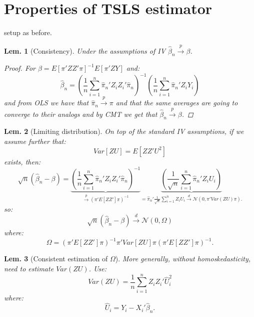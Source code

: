 \documentclass{tufte-book}
\theoremstyle{mytheoremstyle}
\theoremstyle{mylemstyle}
\newtheorem*{lem}{Lem.}
\theoremstyle{mydefstyle}
\begin{document}
\section{Properties of TSLS estimator}
 setup as before. 
\begin{lem}[Consistency] Under the assumptions of IV \(\hat{\beta}_n \overset{p}{\rightarrow} \beta\). 
	\begin{proof} For \(\beta = E[\pi'ZZ'\pi]^{-1}E[\pi'ZY]\) and:
	\[\hat{\beta}_n = \left(\frac{1}{n} \sum_{i=1}^n \hat{\pi}_n' Z_i Z_i' \hat{\pi}_n \right)^{-1}\left(\frac{1}{n} \sum_{i=1}^n \hat{\pi}_n'Z_i Y_i  \right)\]
	and from OLS we have that \(\hat{\pi}_n \overset{p}{\rightarrow} \pi\) and that the same averages are going to converge to their analogs and by CMT we get that \(\hat{\beta}_n \overset{p}{\rightarrow} \beta\).
	\end{proof}
\end{lem}
\begin{lem}[Limiting distribution] On top of the standard IV assumptions, if we assume further that:
	\[Var[ZU] = E[ZZ'U^2]\]
exists, then:
	\[\sqrt{n}(\hat{\beta}_n - \beta) = \underbrace{\left(\frac{1}{n} \sum_{i=1}^n \hat{\pi}_n' Z_i Z_i' \hat{\pi}_n \right)^{-1}}_\textrm{\(\overset{p}{\rightarrow} (\pi'E[ZZ']\pi)^{-1}\)} \underbrace{\left(\frac{1}{\sqrt{n}} \sum_{i=1}^n \hat{\pi}_n'Z_i U_i  \right)}_\textrm{\(= \hat{\pi}_n' \frac{1}{\sqrt{n}} \sum_{i=1}^n Z_i U_i \overset{d}{\rightarrow} \mathcal{N}(0, \pi' Var(ZU) \pi )\).}\]
so:
	\[\sqrt{n}(\hat{\beta}_n - \beta) \overset{d}{\rightarrow} \mathcal{N}(0, \Omega)\]
where:
	\[\Omega = (\pi'E[ZZ']\pi)^{-1}\pi'Var[ZU]\pi(\pi'E[ZZ']\pi)^{-1} \text{.}\]
\end{lem}
\begin{lem}[Consistent estimation of \(\Omega\)]  More generally, without homoskedasticity, need to estimate \(Var(ZU)\). Use:
	\[Var(ZU) = \frac{1}{n}\sum_{i=1}^n Z_iZ_i'\hat{U}_i^2\]
where:
	\[\hat{U}_i = Y_i - X_i'\hat{\beta}_n \text{.}\]
\end{lem}
\end{document}
